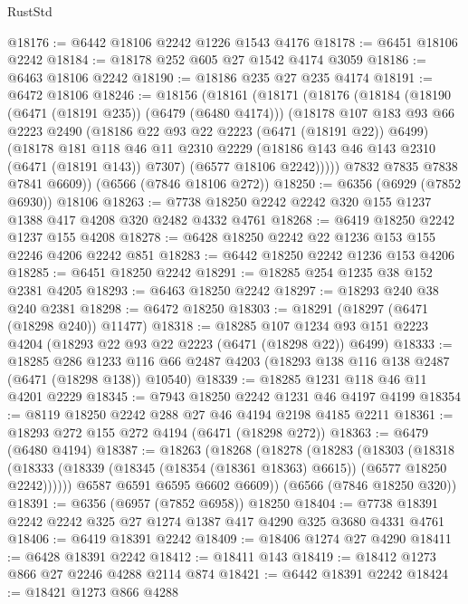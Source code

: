 \begin{lexlean}{RustStd}
\begin{coremodule}
{\begin{coremodule}
{{{{{{{{{{{{{{{{{{{{{{{{{{@18176 := @6442 @18106 @2242 @1226 @1543 @4176
@18178 := @6451 @18106 @2242
@18184 := @18178 @252 @605 @27 @1542 @4174 @3059
@18186 := @6463 @18106 @2242
@18190 := @18186 @235 @27 @235 @4174
@18191 := @6472 @18106
@18246 := @18156
    (@18161
      (@18171
        (@18176
          (@18184
            (@18190 (@6471 (@18191 @235)) (@6479 (@6480 @4174)))
            (@18178
              @107
              @183
              @93
              @66
              @2223
              @2490
              (@18186 @22 @93 @22 @2223 (@6471 (@18191 @22)) @6499)
              (@18178
                @181
                @118
                @46
                @11
                @2310
                @2229
                (@18186 @143 @46 @143 @2310 (@6471 (@18191 @143)) @7307)
                (@6577 @18106 @2242)))))
        @7832
        @7835
        @7838
        @7841
        @6609))
    (@6566 (@7846 @18106 @272))
@18250 := @6356 (@6929 (@7852 @6930)) @18106
@18263 := @7738 @18250 @2242 @2242 @320 @155 @1237 @1388 @417 @4208 @320 @2482 @4332 @4761
@18268 := @6419 @18250 @2242 @1237 @155 @4208
@18278 := @6428 @18250 @2242 @22 @1236 @153 @155 @2246 @4206 @2242 @851
@18283 := @6442 @18250 @2242 @1236 @153 @4206
@18285 := @6451 @18250 @2242
@18291 := @18285 @254 @1235 @38 @152 @2381 @4205
@18293 := @6463 @18250 @2242
@18297 := @18293 @240 @38 @240 @2381
@18298 := @6472 @18250
@18303 := @18291 (@18297 (@6471 (@18298 @240)) @11477)
@18318 := @18285
    @107
    @1234
    @93
    @151
    @2223
    @4204
    (@18293 @22 @93 @22 @2223 (@6471 (@18298 @22)) @6499)
@18333 := @18285
    @286
    @1233
    @116
    @66
    @2487
    @4203
    (@18293 @138 @116 @138 @2487 (@6471 (@18298 @138)) @10540)
@18339 := @18285 @1231 @118 @46 @11 @4201 @2229
@18345 := @7943 @18250 @2242 @1231 @46 @4197 @4199
@18354 := @8119 @18250 @2242 @288 @27 @46 @4194 @2198 @4185 @2211
@18361 := @18293 @272 @155 @272 @4194 (@6471 (@18298 @272))
@18363 := @6479 (@6480 @4194)
@18387 := @18263
    (@18268
      (@18278
        (@18283
          (@18303
            (@18318
              (@18333 (@18339 (@18345 (@18354 (@18361 @18363) @6615)) (@6577 @18250 @2242))))))
        @6587
        @6591
        @6595
        @6602
        @6609))
    (@6566 (@7846 @18250 @320))
@18391 := @6356 (@6957 (@7852 @6958)) @18250
@18404 := @7738 @18391 @2242 @2242 @325 @27 @1274 @1387 @417 @4290 @325 @3680 @4331 @4761
@18406 := @6419 @18391 @2242
@18409 := @18406 @1274 @27 @4290
@18411 := @6428 @18391 @2242
@18412 := @18411 @143
@18419 := @18412 @1273 @866 @27 @2246 @4288 @2114 @874
@18421 := @6442 @18391 @2242
@18424 := @18421 @1273 @866 @4288
}}}}}}}}}}}}}}}}}}}}}}}}}}
\end{coremodule}}
\end{coremodule}
\end{lexlean}
